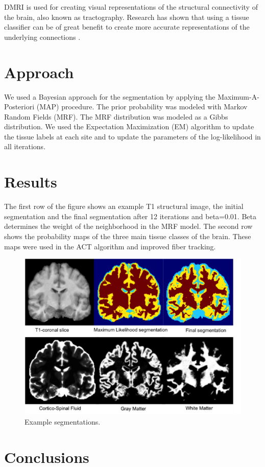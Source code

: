\documentclass[twocolumn]{bmcart}%
\begin{document}
DMRI is used for creating visual representations of the structural
connectivity of the brain, also known as tractography. Research has
shown that using a tissue classifier can be of great benefit to create
more accurate representations of the underlying connections
\cite{Girard2014}.

\section{Approach}\label{approach}

We used a Bayesian approach for the segmentation
\cite{Zhang2001,Avants2011} by applying the Maximum-A-Posteriori (MAP)
procedure. The prior probability was modeled with Markov Random Fields
(MRF). The MRF distribution was modeled as a Gibbs distribution. We used
the Expectation Maximization (EM) algorithm to update the tissue labels
at each site and to update the parameters of the log-likelihood in all
iterations.

\section{Results}\label{results}

The first row of the figure shows an example T1 structural image, the
initial segmentation and the final segmentation after 12 iterations and
beta=0.01. Beta determines the weight of the neighborhood in the MRF
model. The second row shows the probability maps of the three main
tissue classes of the brain. These maps were used in the ACT algorithm
and improved fiber tracking.

\begin{figure}[h!]
  \includegraphics[width=.48\textwidth]{brainseg.png}
  \caption{\label{centfig} Example segmentations.}
\end{figure}

\section{Conclusions}\label{conclusions}
\end{document}
